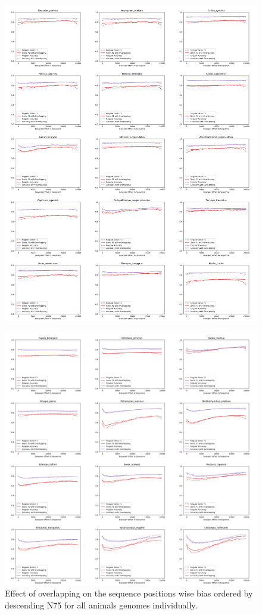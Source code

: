 \documentclass{article}
\renewcommand{\thefigure}{S\arabic{figure}}
\begin{document}
\begin{figure}[!h]
\centerline{\includegraphics[width=\overlapscale\textwidth]{images/overlapping/montage_animals12}}
\end{figure}
\begin{figure}[!h]
\centerline{\includegraphics[width=1.2\textwidth]{images/overlapping/montage_animals13}}
\caption{Effect of overlapping on the sequence positions wise bias ordered by descending N75 for all animals genomes individually.}
\label{supfig:overlapping_animals}
\end{figure}
\end{document}
